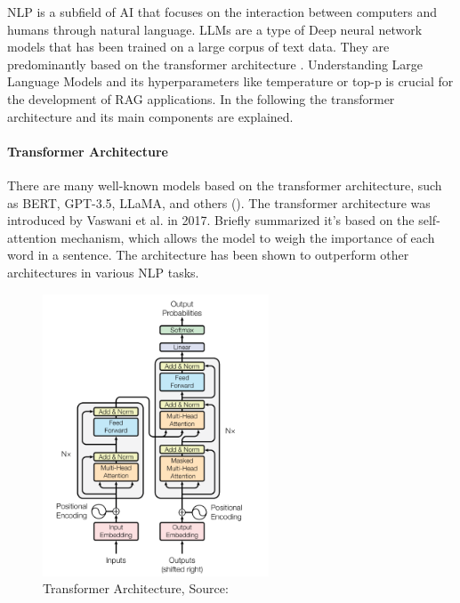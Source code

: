 

NLP is a subfield of AI that focuses on the interaction between computers and humans through natural language. LLMs are a type of Deep neural network models that has been trained on a large corpus of text data. They are predominantly based on the transformer architecture \citet{Wolf.09.10.2019}. Understanding Large Language Models and its hyperparameters like temperature or top-p is crucial for the development of RAG applications. In the following the transformer architecture and its main components are explained.

\paragraph{Transformer Architecture}
There are many well-known models based on the transformer architecture, such as BERT, GPT-3.5, LLaMA, and others (\citet{Yin.2024}). The transformer architecture was introduced by Vaswani et al. in 2017. Briefly summarized it's based on the self-attention mechanism, which allows the model to weigh the importance of each word in a sentence. The architecture has been shown to outperform other architectures in various NLP tasks.

\begin{figure}[!ht]
    \centering
    \includegraphics[width=0.6\textwidth]{images/transformers_architecture.png}
    \caption{Transformer Architecture, Source: \citet{vaswani2023attentionneed}}
    \label{fig:transformer_architecture}
\end{figure}

